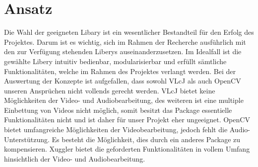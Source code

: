 \section{Ansatz}
Die Wahl der geeigneten Libary ist ein wesentlicher Bestandteil für den Erfolg des Projektes. Darum ist es wichtig, sich im Rahmen der Recherche ausführlich mit den zur Verfügung stehenden Liberys auseinanderzusetzen. Im Idealfall ist die gewählte Libery intuitiv bedienbar, modularisierbar und erfüllt sämtliche Funktionalitäten, welche im Rahmen des Projektes verlangt werden. Bei der Auswertung der Konzepte ist aufgefallen, dass sowohl VLcJ als auch OpenCV unseren Ansprüchen nicht vollends gerecht werden. VLcJ bietet keine Möglichkeiten der Video- und Audiobearbeitung, des weiteren ist eine multiple Einbettung von Videos nicht möglich, somit besitzt das Package essentielle Funktionalitäten nicht und ist daher für unser Projekt eher ungeeignet. OpenCV bietet umfangreiche Möglichkeiten der Videobearbeitung, jedoch fehlt die Audio-Unterstützung. Es besteht die Möglichkeit, dies durch ein anderes Package zu kompensieren. Xuggler bietet die geforderten Funktionalitäten in vollem Umfang hinsichtlich der Video- und Audiobearbeitung.
